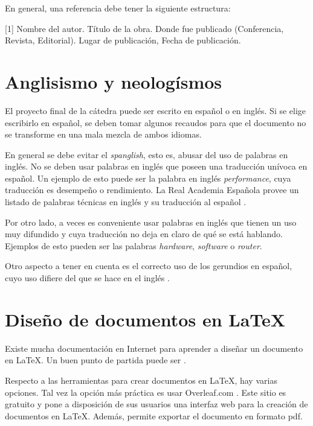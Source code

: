 \documentclass{article}
\begin{document}
En general, una referencia debe tener la siguiente estructura:

[1] Nombre del autor. Título de la obra. Donde fue publicado (Conferencia, Revista, Editorial). Lugar de publicación, Fecha de publicación.

\section{Anglisismo y neologísmos}

El proyecto final de la cátedra puede ser escrito en español o en inglés. Si se elige escribirlo en español, se deben tomar algunos recaudos para que el documento no se transforme en una mala mezcla de ambos idiomas.

En general se debe evitar el \emph{spanglish}, esto es, abusar del uso de palabras en inglés. No se deben usar palabras en inglés que poseen una traducción unívoca en español. Un ejemplo de esto puede ser la palabra en inglés \emph{performance}, cuya traducción es desempeño o rendimiento. La Real Academia Española provee un listado de palabras técnicas en inglés y su traducción al español \cite{Rae2019}.

Por otro lado, a veces es conveniente usar palabras en inglés que tienen un uso muy difundido y cuya traducción no deja en claro de qué se está hablando. Ejemplos de esto pueden ser las palabras \emph{hardware}, \emph{software} o \emph{router}.

Otro aspecto a tener en cuenta es el correcto uso de los gerundios en español, cuyo uso difiere del que se hace en el inglés \cite{Mandado}.

\section{Diseño de documentos en \LaTeX}

Existe mucha documentación en Internet para aprender a diseñar un documento en \LaTeX. Un buen punto de partida puede ser \cite{Latexbook}.

Respecto a las herramientas para crear documentos en \LaTeX{}, hay varias opciones. Tal vez la opción más práctica es usar Overleaf.com \cite{Overleaf2019}. Este sitio es gratuito y pone a disposición de sus usuarios una interfaz web para la creación de documentos en \LaTeX. Además, permite exportar el documento en formato pdf.
\end{document}
